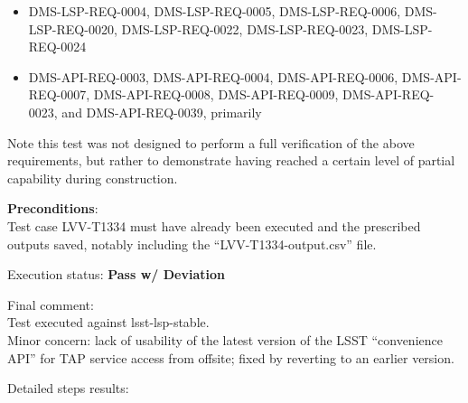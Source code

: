 \documentclass[DM,STR,toc]{lsstdoc}
\providecommand{\tightlist}{
  \setlength{\itemsep}{0pt}\setlength{\parskip}{0pt}}
\begin{document}
\begin{itemize}
\tightlist
\item
  DMS-LSP-REQ-0004, DMS-LSP-REQ-0005, DMS-LSP-REQ-0006,
  DMS-LSP-REQ-0020, DMS-LSP-REQ-0022, DMS-LSP-REQ-0023, DMS-LSP-REQ-0024
\item
  DMS-API-REQ-0003, DMS-API-REQ-0004, DMS-API-REQ-0006,
  DMS-API-REQ-0007, DMS-API-REQ-0008, DMS-API-REQ-0009,
  DMS-API-REQ-0023, and DMS-API-REQ-0039, primarily
\end{itemize}

Note this test was not designed to perform a full verification of the
above requirements, but rather to demonstrate having reached a certain
level of partial capability during construction.


\textbf{ Preconditions}:\\
Test case LVV-T1334 must have already been executed and the prescribed
outputs saved, notably including the ``LVV-T1334-output.csv'' file.


Execution status: {\bf Pass w/ Deviation }

Final comment:\\Test executed against lsst-lsp-stable.\\
Minor concern: lack of usability of the latest version of the LSST
``convenience API'' for TAP service access from offsite; fixed by
reverting to an earlier version.



Detailed steps results:
\end{document}
